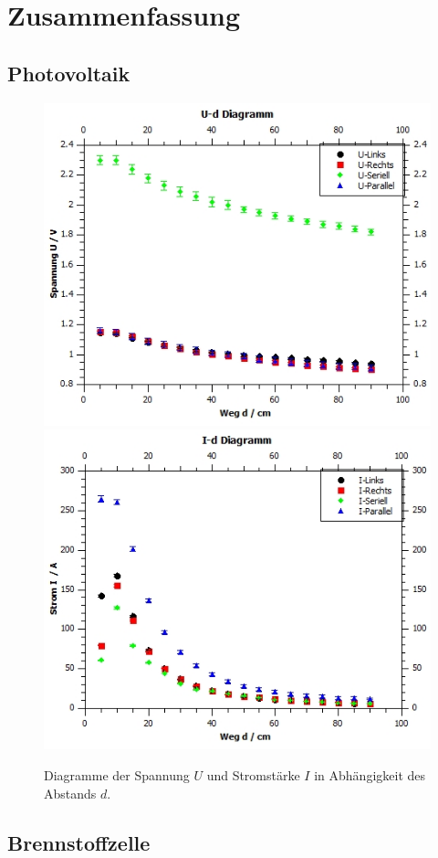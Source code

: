 \documentclass[12pt,a4paper,twoside]{article}
\begin{document}
\section{Zusammenfassung} %
\subsection{Photovoltaik}

\begin{figure}[H]
    \centering
    \includegraphics[width=0.6\linewidth]{nudes/u-d diagramm.jpg}
    \includegraphics[width=0.6\linewidth]{nudes/i-d diagramm.jpg}
    \caption{Diagramme der Spannung $U$ und Stromstärke $I$ in Abhängigkeit des Abstands $d$.}
    \label{fig:zusammenfassung Photovoltaik}
\end{figure}

\subsection{Brennstoffzelle}
\end{document}
